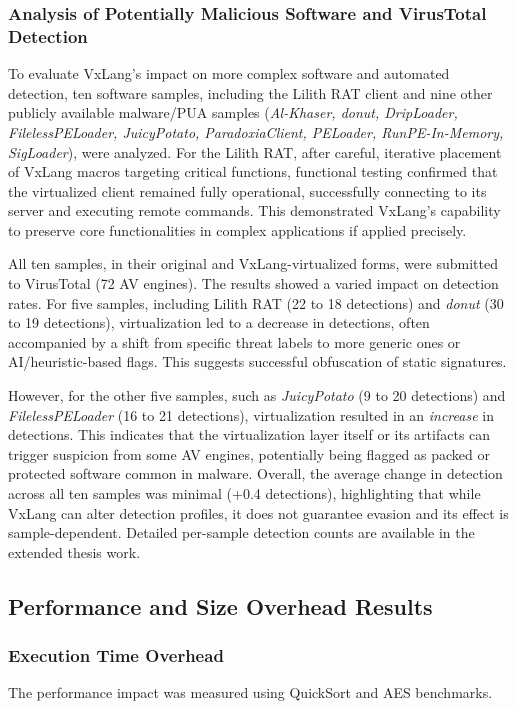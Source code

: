 \subsubsection{Analysis of Potentially Malicious Software and VirusTotal Detection}
To evaluate VxLang's impact on more complex software and automated detection, ten software samples, including the Lilith RAT client \cite{LilithRAT} and nine other publicly available malware/PUA samples (\textit{Al-Khaser, donut, DripLoader, FilelessPELoader, JuicyPotato, ParadoxiaClient, PELoader, RunPE-In-Memory, SigLoader}), were analyzed. For the Lilith RAT, after careful, iterative placement of VxLang macros targeting critical functions, functional testing confirmed that the virtualized client remained fully operational, successfully connecting to its server and executing remote commands. This demonstrated VxLang's capability to preserve core functionalities in complex applications if applied precisely.

All ten samples, in their original and VxLang-virtualized forms, were submitted to VirusTotal (72 AV engines). The results showed a varied impact on detection rates. For five samples, including Lilith RAT (22 to 18 detections) and \textit{donut} (30 to 19 detections), virtualization led to a decrease in detections, often accompanied by a shift from specific threat labels to more generic ones or AI/heuristic-based flags. This suggests successful obfuscation of static signatures.

However, for the other five samples, such as \textit{JuicyPotato} (9 to 20 detections) and \textit{FilelessPELoader} (16 to 21 detections), virtualization resulted in an \textit{increase} in detections. This indicates that the virtualization layer itself or its artifacts can trigger suspicion from some AV engines, potentially being flagged as packed or protected software common in malware. Overall, the average change in detection across all ten samples was minimal (+0.4 detections), highlighting that while VxLang can alter detection profiles, it does not guarantee evasion and its effect is sample-dependent. Detailed per-sample detection counts are available in the extended thesis work.

\subsection{Performance and Size Overhead Results}

\subsubsection{Execution Time Overhead}
The performance impact was measured using QuickSort and AES benchmarks.

